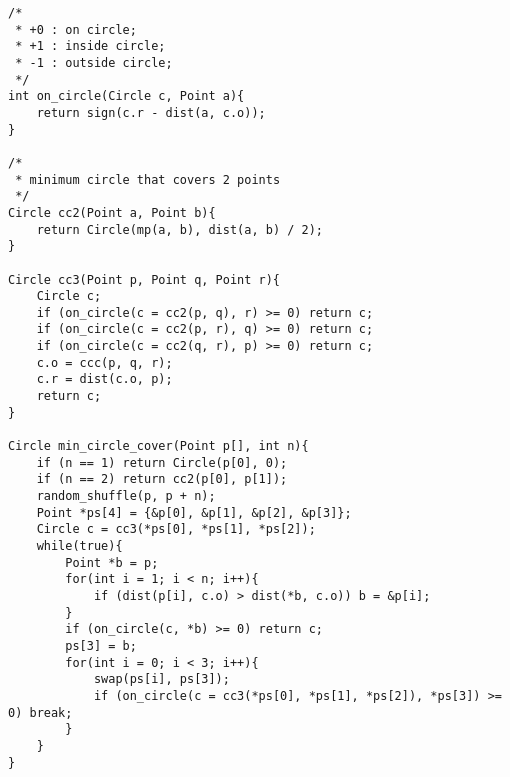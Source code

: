 \begin{verbatim}
/*
 * +0 : on circle;
 * +1 : inside circle;
 * -1 : outside circle;
 */
int on_circle(Circle c, Point a){
    return sign(c.r - dist(a, c.o));
}

/*
 * minimum circle that covers 2 points
 */
Circle cc2(Point a, Point b){
    return Circle(mp(a, b), dist(a, b) / 2);
}

Circle cc3(Point p, Point q, Point r){
    Circle c;
    if (on_circle(c = cc2(p, q), r) >= 0) return c;
    if (on_circle(c = cc2(p, r), q) >= 0) return c;
    if (on_circle(c = cc2(q, r), p) >= 0) return c;
    c.o = ccc(p, q, r);
    c.r = dist(c.o, p);
    return c;
}

Circle min_circle_cover(Point p[], int n){
    if (n == 1) return Circle(p[0], 0);
    if (n == 2) return cc2(p[0], p[1]);
    random_shuffle(p, p + n);
    Point *ps[4] = {&p[0], &p[1], &p[2], &p[3]};
    Circle c = cc3(*ps[0], *ps[1], *ps[2]);
    while(true){
        Point *b = p;
        for(int i = 1; i < n; i++){
            if (dist(p[i], c.o) > dist(*b, c.o)) b = &p[i];
        }
        if (on_circle(c, *b) >= 0) return c;
        ps[3] = b;
        for(int i = 0; i < 3; i++){
            swap(ps[i], ps[3]);
            if (on_circle(c = cc3(*ps[0], *ps[1], *ps[2]), *ps[3]) >= 0) break;
        }
    }
}

\end{verbatim}
